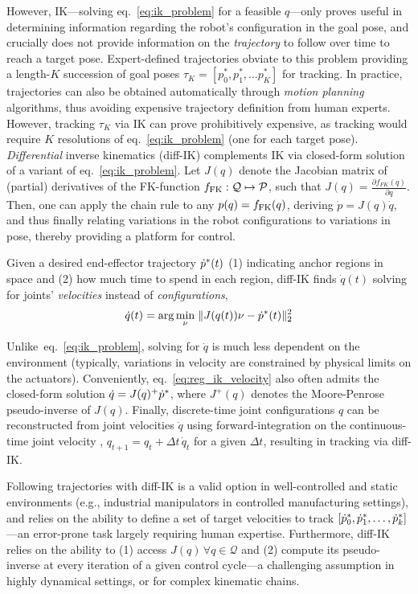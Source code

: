 However, IK---solving eq.~\ref{eq:ik_problem} for a feasible \( q \)---only proves useful in determining information regarding the robot's configuration in the goal pose, and crucially does not provide information on the \emph{trajectory} to follow over time to reach a target pose.
Expert-defined trajectories obviate to this problem providing a length-\(K\) succession of goal poses \( \tau_K = [p^*_0, p^*_1, \dots p^*_K] \) for tracking.
In practice, trajectories can also be obtained automatically through \emph{motion planning} algorithms, thus avoiding expensive trajectory definition from human experts.
However, tracking \( \tau_K \) via IK can prove prohibitively expensive, as tracking would require \( K \) resolutions of eq.~\ref{eq:ik_problem} (one for each target pose).
\emph{Differential} inverse kinematics (diff-IK) complements IK via closed-form solution of a variant of eq.~\ref{eq:ik_problem}. 
Let \( J(q) \) denote the Jacobian matrix of (partial) derivatives of the FK-function \( f_{\text{FK}}: \mathcal Q \mapsto \mathcal P \), such that \( J(q) = \frac{\partial f_{FK}(q)}{\partial q } \).
Then, one can apply the chain rule to any \( p(q) = f_{\text{FK}}(q) \), deriving \( \dot p = J(q) \dot q \), and thus finally relating variations in the robot configurations to variations in pose, thereby providing a platform for control.

Given a desired end-effector trajectory \( \dot {p}^*(t) \) (1) indicating anchor regions in space and (2) how much time to spend in each region, diff-IK finds \( \dot q(t) \) solving for joints' \emph{velocities} instead of \emph{configurations},
\begin{align}
\dot q(t) = \arg\min_\nu \; \lVert J(q(t)) \nu - \dot {p}^* (t) \rVert_2^2
\label{eq:reg_ik_velocity}
\end{align}

Unlike~eq.~\ref{eq:ik_problem}, solving for \( \dot q \) is much less dependent on the environment (typically, variations in velocity are constrained by physical limits on the actuators).
Conveniently, eq.~\ref{eq:reg_ik_velocity} also often admits the closed-form solution \( \dot q = J(q)^+ \dot {p}^* \), where \( J^+(q) \) denotes the Moore-Penrose pseudo-inverse of \( J(q) \).
Finally, discrete-time joint configurations \( q \) can be reconstructed from joint velocities \( \dot q \) using forward-integration on the continuous-time joint velocity , \( q_{t+1} = q_t + \Delta t\,\dot q_t \) for a given \( \Delta t \), resulting in tracking via diff-IK.

Following trajectories with diff-IK is a valid option in well-controlled and static environments (e.g., industrial manipulators in controlled manufacturing settings), and relies on the ability to define a set of target velocities to track \( [\dot {p}^*_0, \dot {p}^*_1, \dots, \dot {p}^*_k ] \)---an error-prone task largely requiring human expertise.
Furthermore, diff-IK relies on the ability to (1) access \( J(q) \, \forall q \in \mathcal Q \) and (2) compute its pseudo-inverse at every iteration of a given control cycle---a challenging assumption in highly dynamical settings, or for complex kinematic chains.

